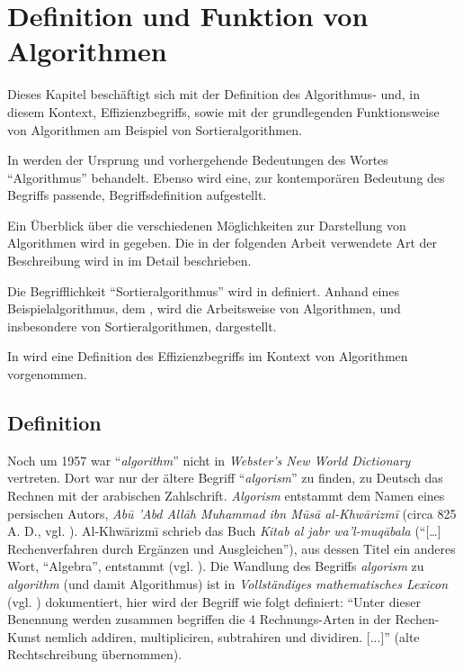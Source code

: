\chapter{Definition und Funktion von Algorithmen}
\label{cha:definition-funktion-algorithmen}
\vspace{-0.25cm}
Dieses Kapitel beschäftigt sich mit der Definition des Algorithmus- und, in diesem Kontext, Effizienzbegriffs, sowie mit der grundlegenden Funktionsweise von Algorithmen am Beispiel von Sortieralgorithmen.

In  werden der Ursprung und vorhergehende Bedeutungen des Wortes \enquote{Algorithmus} behandelt. Ebenso wird eine, zur kontemporären Bedeutung des Begriffs passende, Begriffsdefinition aufgestellt.

Ein Überblick über die verschiedenen Möglichkeiten zur Darstellung von Algorithmen wird in  gegeben. Die in der folgenden Arbeit verwendete Art der Beschreibung wird in  im Detail beschrieben.

Die Begrifflichkeit \enquote{Sortieralgorithmus} wird in  definiert. Anhand eines Beispielalgorithmus, dem , wird die Arbeitsweise von Algorithmen, und insbesondere von Sortieralgorithmen, dargestellt.

In  wird eine Definition des Effizienzbegriffs im Kontext von Algorithmen vorgenommen.
%
\vspace{-0.25cm}
\section{Definition}
\label{sec:algorithm-definition}

Noch um 1957 war \enquote{\emph{algorithm}} nicht in \emph{Webster's New World Dictionary} vertreten. Dort war nur der ältere Begriff \enquote{\emph{algorism}} zu finden, zu Deutsch das Rechnen mit der arabischen Zahlschrift. \emph{Algorism} entstammt dem Namen eines persischen Autors, \emph{Abū 'Abd Allāh Muhammad ibn Mūsā al-Khwārizmī} \footnotemark (circa 825 A. D., vgl. \cite[1--2]{taocp1}). Al-Khwārizmī schrieb das Buch \emph{Kitab al jabr wa'l-muqābala} (\enquote{[\ldots] Rechenverfahren durch Ergänzen und Ausgleichen}), aus dessen Titel ein anderes Wort, \enquote{Algebra}, entstammt (vgl. \cite[197--199]{ger1984}). Die Wandlung des Begriffs \emph{algorism} zu \emph{algorithm} (und damit Algorithmus) ist in \emph{Vollständiges mathematisches Lexicon} (vgl. \cite[38]{wol1747}) dokumentiert, hier wird der Begriff wie folgt definiert: \enquote{Unter dieser Benennung werden zusammen begriffen die 4 Rechnungs-Arten in der Rechen-Kunst nemlich addiren, multipliciren, subtrahiren und dividiren. [...]} (alte Rechtschreibung übernommen).

